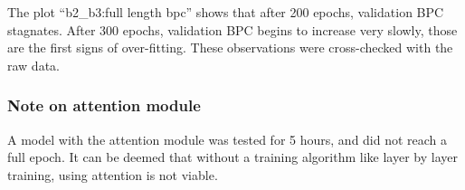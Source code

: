 The plot ``b2\_b3:full length bpc'' shows that after 200 epochs,
validation BPC stagnates. After 300 epochs, validation BPC begins to
increase very slowly, those are the first signs of over-fitting. These
observations were cross-checked with the raw data.

\subsubsection{Note on attention module}

A model with the attention module was tested for 5 hours, and did not
reach a full epoch. It can be deemed that without a training algorithm
like layer by layer training, using attention is not viable.
